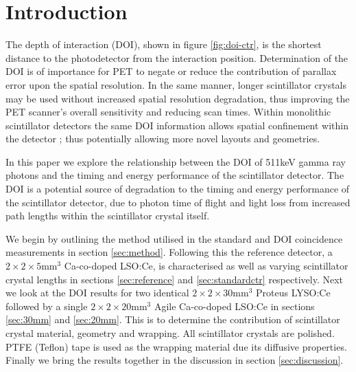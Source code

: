\section{Introduction} 
The depth of interaction (DOI), shown in figure \ref{fig:doi-ctr}, is the shortest distance to the photodetector from the interaction position. Determination of the DOI is of importance for PET to negate or reduce the contribution of parallax error upon the spatial resolution\cite{Moses_2001}\cite{Humm_Rosenfeld_Del_Guerra_2003}. In the same manner, longer scintillator crystals may be used without increased spatial resolution degradation, thus improving the PET scanner's overall sensitivity and reducing scan times. Within monolithic scintillator detectors the same DOI information allows spatial confinement within the detector \cite{am_Borghi_Seifert_Schaart_2013}\cite{Maas_Bruyndonckx_Schaart_2012}; thus potentially allowing more novel\cite{Dendooven_Lohner_Beekman_2009}\cite{n_der_Lei_van_Dam_Schaart_2013} layouts and geometries.

In this paper we explore the relationship between the DOI of 511keV gamma ray photons and the timing and energy performance of the scintillator detector. The DOI is a potential source of degradation to the timing and energy performance of the scintillator detector, due to photon time of flight and light loss from increased path lengths within the scintillator crystal itself.

We begin by outlining the method utilised in the standard and DOI coincidence measurements in section \ref{sec:method}. Following this the reference detector, a $2\times2\times5$mm$^3$ Ca-co-doped LSO:Ce, is characterised as well as varying scintillator crystal lengths in sections \ref{sec:reference} and \ref{sec:standardctr} respectively. Next we look at the DOI results for two identical $2\times2\times30$mm$^3$ Proteus LYSO:Ce followed by a single $2\times2\times20$mm$^3$ Agile Ca-co-doped LSO:Ce in sections \ref{sec:30mm} and \ref{sec:20mm}. This is to determine the contribution of scintillator crystal material, geometry and wrapping. All scintillator crystals are polished. PTFE (Teflon) tape is used as the wrapping material due its diffusive properties. Finally we bring the results together in the discussion in section \ref{sec:discussion}.

